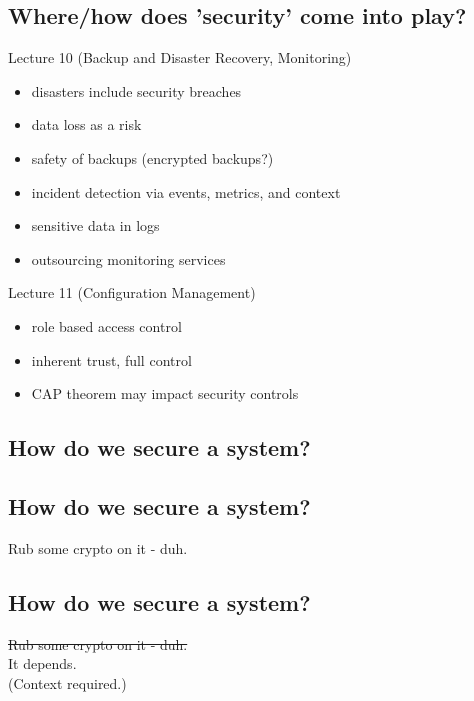 \documentclass[xga]{xdvislides}
\begin{document}
\subsection{Where/how does 'security' come into play?}
Lecture 10 (Backup and Disaster Recovery, Monitoring)
\begin{itemize}
	\item disasters include security breaches
	\item data loss as a risk
	\item safety of backups (encrypted backups?)
	\item incident detection via events, metrics, and context
	\item sensitive data in logs
	\item outsourcing monitoring services
\end{itemize}
\vspace{.2in}
Lecture 11 (Configuration Management)
\begin{itemize}
	\item role based access control
	\item inherent trust, full control
	\item CAP theorem may impact security controls
\end{itemize}

\subsection{How do we secure a system?}

\subsection{How do we secure a system?}
\Huge
\vspace*{\fill}
\begin{center}
	Rub some crypto on it - duh. \\
\end{center}
\vspace*{\fill}

\subsection{How do we secure a system?}
\Huge
\vspace*{\fill}
\begin{center}
	\sout{Rub some crypto on it - duh.} \\
\vspace{.5in}
	It depends. \\
\vspace{.5in}
\Normalsize
	(Context required.)
\end{center}
\vspace*{\fill}
\end{document}
